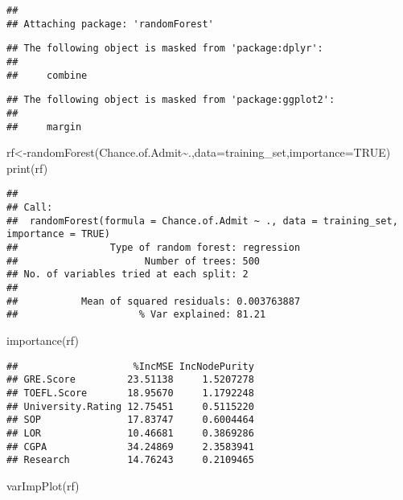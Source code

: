 \documentclass[
]{article}
\newenvironment{Shaded}{\begin{snugshade}}{\end{snugshade}}
\newcommand{\AttributeTok}[1]{\textcolor[rgb]{0.77,0.63,0.00}{#1}}
\newcommand{\ConstantTok}[1]{\textcolor[rgb]{0.00,0.00,0.00}{#1}}
\newcommand{\FunctionTok}[1]{\textcolor[rgb]{0.00,0.00,0.00}{#1}}
\newcommand{\NormalTok}[1]{#1}
\newcommand{\OtherTok}[1]{\textcolor[rgb]{0.56,0.35,0.01}{#1}}
\newcommand{\SpecialCharTok}[1]{\textcolor[rgb]{0.00,0.00,0.00}{#1}}
\begin{document}
\begin{verbatim}
## 
## Attaching package: 'randomForest'
\end{verbatim}

\begin{verbatim}
## The following object is masked from 'package:dplyr':
## 
##     combine
\end{verbatim}

\begin{verbatim}
## The following object is masked from 'package:ggplot2':
## 
##     margin
\end{verbatim}

\begin{Shaded}
\begin{Highlighting}[]
\NormalTok{rf}\OtherTok{\textless{}{-}}\FunctionTok{randomForest}\NormalTok{(Chance.of.Admit}\SpecialCharTok{\textasciitilde{}}\NormalTok{.,}\AttributeTok{data=}\NormalTok{training\_set,}\AttributeTok{importance=}\ConstantTok{TRUE}\NormalTok{)}
\FunctionTok{print}\NormalTok{(rf)}
\end{Highlighting}
\end{Shaded}

\begin{verbatim}
## 
## Call:
##  randomForest(formula = Chance.of.Admit ~ ., data = training_set,      importance = TRUE) 
##                Type of random forest: regression
##                      Number of trees: 500
## No. of variables tried at each split: 2
## 
##           Mean of squared residuals: 0.003763887
##                     % Var explained: 81.21
\end{verbatim}

\begin{Shaded}
\begin{Highlighting}[]
\FunctionTok{importance}\NormalTok{(rf)}
\end{Highlighting}
\end{Shaded}

\begin{verbatim}
##                    %IncMSE IncNodePurity
## GRE.Score         23.51138     1.5207278
## TOEFL.Score       18.95670     1.1792248
## University.Rating 12.75451     0.5115220
## SOP               17.83747     0.6004464
## LOR               10.46681     0.3869286
## CGPA              34.24869     2.3583941
## Research          14.76243     0.2109465
\end{verbatim}

\begin{Shaded}
\begin{Highlighting}[]
\FunctionTok{varImpPlot}\NormalTok{(rf)}
\end{Highlighting}
\end{Shaded}
\end{document}
